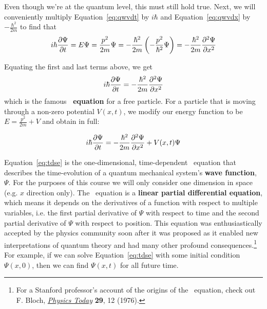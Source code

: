 Even though we're at the quantum level, this must still hold true. Next, we will conveniently multiply Equation~\ref{eq:qwvdt} by $i\hbar$ and Equation~\ref{eq:qwvdx} by $-\frac{\hbar^2}{2m}$ to find that
\begin{equation*}
	i\hbar \pdv{\Psi}{t} = E\Psi = \frac{p^2}{2m} \Psi = -\frac{\hbar^2}{2m} \left( -\frac{p^2}{\hbar^2}\Psi \right) = -\frac{\hbar^2}{2m} \pdv[2]{\Psi}{x}
\end{equation*}

Equating the first and last terms above, we get 
\begin{equation}
	i\hbar \pdv{\Psi}{t} = -\frac{\hbar^2}{2m} \pdv[2]{\Psi}{x}
\end{equation}
which is the famous \textbf{\Sch\ equation} for a free particle. For a particle that is moving through a non-zero potential $V(x,t)$, we modify our energy function to be $E = \frac{p^2}{2m} + V$ and obtain in full: 
\begin{tcolorbox}[title=Time-dependent \Sch\ equation] \vspace{-2ex}
\begin{equation}
	i\hbar \pdv{\Psi}{t} = -\frac{\hbar^2}{2m} \pdv[2]{\Psi}{x} + V(x,t)\Psi \label{eq:tdse}
\end{equation}
\end{tcolorbox}

Equation~\ref{eq:tdse} is the one-dimensional, time-dependent \Sch\ equation that describes the time-evolution of a quantum mechanical system's \textbf{wave function}, $\Psi$. For the purposes of this course we will only consider one dimension in space (e.g. $x$ direction only). The \Sch\ equation is a \textbf{linear partial differential equation}, which means it depends on the derivatives of a function with respect to multiple variables, i.e. the first partial derivative of $\Psi$ with respect to time and the second partial derivative of $\Psi$ with respect to position. This equation was enthusiastically accepted by the physics community soon after it was proposed as it enabled new interpretations of quantum theory and had many other profound consequences.\footnote{For a Stanford professor's account of the origins of the \Sch\ equation, check out F. Bloch, \href{http://physicstoday.scitation.org/doi/pdf/10.1063/1.3024633}{\emph{Physics Today}} \textbf{29}, 12 (1976).} For example, if we can solve Equation~\ref{eq:tdse} with some initial condition $\Psi(x,0)$, then we can find $\Psi(x,t)$ for all future time.


